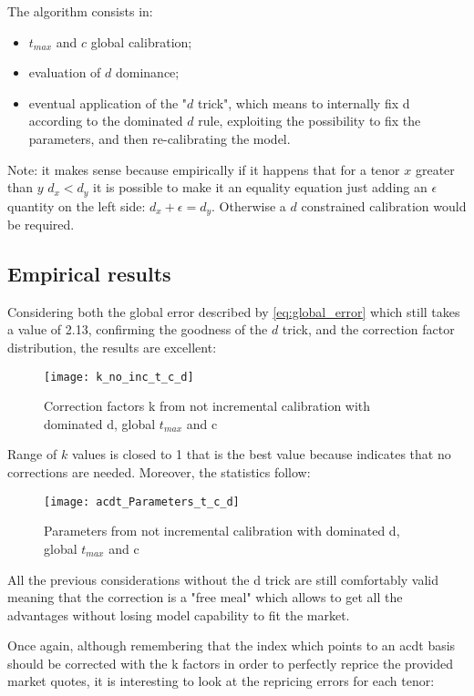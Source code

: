 The algorithm consists in:

\begin{itemize}
    \item $t_{max}$ and $c$ global calibration;
    \item evaluation of $d$ dominance;
    \item eventual application of the "$d$ trick", which means to internally fix d according to the dominated $d$ rule, exploiting the possibility to fix the parameters, and then re-calibrating the model.
\end{itemize}

Note: it makes sense because empirically if it happens that for a tenor $x$ greater than $y$ $d_{x}<d_{y}$ it is possible to make it an equality equation just adding an $\epsilon$ quantity on the left side: $d_{x}+\epsilon=d_{y}$. Otherwise a $d$ constrained calibration would be required.

\subsection{Empirical results}

Considering both the global error described by \eqref{eq:global_error} which still takes a value of 2.13, confirming the goodness of the $d$ trick, and the correction factor distribution, the results are excellent:

\begin{figure}[H]
\centering
\texttt{[image: k\_no\_inc\_t\_c\_d]}
\caption{Correction factors k from not incremental calibration with dominated d, global $t_{max}$ and c}
\label{fig:k_no_inc_t_c_d}
\end{figure}

Range of $k$ values is closed to 1 that is the best value because indicates that no corrections are needed.
Moreover, the statistics follow:

\begin{figure}[H]
\centering
\texttt{[image: acdt\_Parameters\_t\_c\_d]}
\caption{Parameters from not incremental calibration with dominated d, global $t_{max}$ and c}
\label{fig:acdt_Parameters_t_c_d}
\end{figure}

All the previous considerations without the d trick are still comfortably valid meaning that the correction is a "free meal" which allows to get all the advantages without losing model capability to fit the market.

Once again, although remembering that the index which points to an acdt basis should be corrected with the k factors in order to perfectly reprice the provided market quotes, it is interesting to look at the repricing errors for each tenor:

